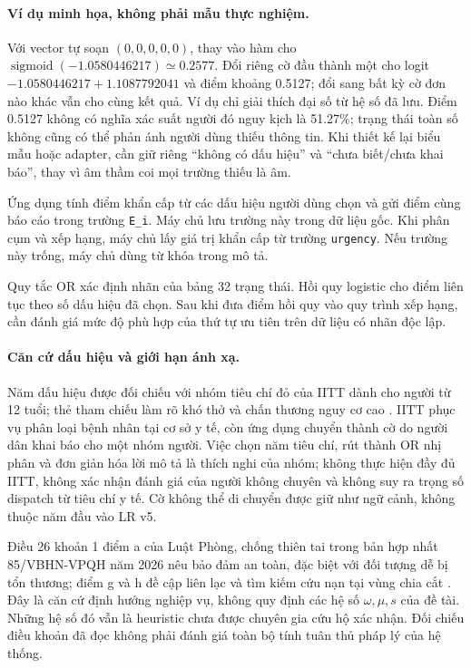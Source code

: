 \paragraph{Ví dụ minh họa, không phải mẫu thực nghiệm.} Với vector tự soạn $(0,0,0,0,0)$, thay vào hàm cho $\operatorname{sigmoid}(-1.0580446217)\simeq0.2577$. Đổi riêng cờ đầu thành một cho logit $-1.0580446217+1.1087792041$ và điểm khoảng 0.5127; đổi sang bất kỳ cờ đơn nào khác vẫn cho cùng kết quả. Ví dụ chỉ giải thích đại số từ hệ số đã lưu. Điểm 0.5127 không có nghĩa xác suất người đó nguy kịch là 51.27\%; trạng thái toàn số không cũng có thể phản ánh người dùng thiếu thông tin. Khi thiết kế lại biểu mẫu hoặc adapter, cần giữ riêng ``không có dấu hiệu'' và ``chưa biết/chưa khai báo'', thay vì âm thầm coi mọi trường thiếu là âm.

Ứng dụng tính điểm khẩn cấp từ các dấu hiệu người dùng chọn và gửi điểm cùng báo cáo trong trường \texttt{E\_i}. Máy chủ lưu trường này trong dữ liệu gốc. Khi phân cụm và xếp hạng, máy chủ lấy giá trị khẩn cấp từ trường \texttt{urgency}. Nếu trường này trống, máy chủ dùng từ khóa trong mô tả.

Quy tắc OR xác định nhãn của bảng 32 trạng thái. Hồi quy logistic cho điểm liên tục theo số dấu hiệu đã chọn. Sau khi đưa điểm hồi quy vào quy trình xếp hạng, cần đánh giá mức độ phù hợp của thứ tự ưu tiên trên dữ liệu có nhãn độc lập.

\paragraph{Căn cứ dấu hiệu và giới hạn ánh xạ.} Năm dấu hiệu được đối chiếu với nhóm tiêu chí đỏ của IITT dành cho người từ 12 tuổi; thẻ tham chiếu làm rõ khó thở và chấn thương nguy cơ cao \citep{whoIITT,whoIITTAdult,whoIITTReference}. IITT phục vụ phân loại bệnh nhân tại cơ sở y tế, còn ứng dụng chuyển thành cờ do người dân khai báo cho một nhóm người. Việc chọn năm tiêu chí, rút thành OR nhị phân và đơn giản hóa lời mô tả là thích nghi của nhóm; không thực hiện đầy đủ IITT, không xác nhận đánh giá của người không chuyên và không suy ra trọng số dispatch từ tiêu chí y tế. Cờ không thể di chuyển được giữ như ngữ cảnh, không thuộc năm đầu vào LR v5.

Điều 26 khoản 1 điểm a của Luật Phòng, chống thiên tai trong bản hợp nhất 85/VBHN-VPQH năm 2026 nêu bảo đảm an toàn, đặc biệt với đối tượng dễ bị tổn thương; điểm g và h đề cập liên lạc và tìm kiếm cứu nạn tại vùng chia cắt \citep{vnDisasterLaw2026}. Đây là căn cứ định hướng nghiệp vụ, không quy định các hệ số $\omega,\mu,s$ của đề tài. Những hệ số đó vẫn là heuristic chưa được chuyên gia cứu hộ xác nhận. Đối chiếu điều khoản đã đọc không phải đánh giá toàn bộ tính tuân thủ pháp lý của hệ thống.

